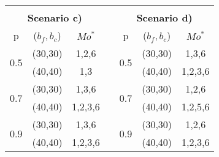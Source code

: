 \begin{table}[h]
{\begin{tabular}{ccccccc}
                                           &                                  &                              &                       &                                           &                                  &                              \\
\multicolumn{3}{c}{\textbf{Scenario c)}}                                                                     &                       & \multicolumn{3}{c}{\textbf{Scenario d)}}                                                                    \\ \cline{1-3} \cline{5-7} 
\multicolumn{1}{|c|}{p}                    & \multicolumn{1}{c|}{($b_f,b_c$)} & \multicolumn{1}{c|}{$Mo^*$}  & \multicolumn{1}{c|}{} & \multicolumn{1}{c|}{p}                    & \multicolumn{1}{c|}{($b_f,b_c$)} & \multicolumn{1}{c|}{$Mo^*$}  \\ \cline{1-3} \cline{5-7} 
\multicolumn{1}{|c|}{\multirow{2}{*}{0.5}} & \multicolumn{1}{c|}{(30,30)}     & \multicolumn{1}{c|}{1,2,6}   & \multicolumn{1}{c|}{} & \multicolumn{1}{c|}{\multirow{2}{*}{0.5}} & \multicolumn{1}{c|}{(30,30)}     & \multicolumn{1}{c|}{1,3,6}   \\ \cline{2-3} \cline{6-7} 
\multicolumn{1}{|c|}{}                     & \multicolumn{1}{c|}{(40,40)}     & \multicolumn{1}{c|}{1,3}     & \multicolumn{1}{c|}{} & \multicolumn{1}{c|}{}                     & \multicolumn{1}{c|}{(40,40)}     & \multicolumn{1}{c|}{1,2,3,6} \\ \cline{1-3} \cline{5-7} 
\multicolumn{1}{|c|}{\multirow{2}{*}{0.7}} & \multicolumn{1}{c|}{(30,30)}     & \multicolumn{1}{c|}{1,3,6}   & \multicolumn{1}{c|}{} & \multicolumn{1}{c|}{\multirow{2}{*}{0.7}} & \multicolumn{1}{c|}{(30,30)}     & \multicolumn{1}{c|}{1,2,6}   \\ \cline{2-3} \cline{6-7} 
\multicolumn{1}{|c|}{}                     & \multicolumn{1}{c|}{(40,40)}     & \multicolumn{1}{c|}{1,2,3,6} & \multicolumn{1}{c|}{} & \multicolumn{1}{c|}{}                     & \multicolumn{1}{c|}{(40,40)}     & \multicolumn{1}{c|}{1,2,5,6} \\ \cline{1-3} \cline{5-7} 
\multicolumn{1}{|c|}{\multirow{2}{*}{0.9}} & \multicolumn{1}{c|}{(30,30)}     & \multicolumn{1}{c|}{1,3,6}   & \multicolumn{1}{c|}{} & \multicolumn{1}{c|}{\multirow{2}{*}{0.9}} & \multicolumn{1}{c|}{(30,30)}     & \multicolumn{1}{c|}{1,2,6}   \\ \cline{2-3} \cline{6-7} 
\multicolumn{1}{|c|}{}                     & \multicolumn{1}{c|}{(40,40)}     & \multicolumn{1}{c|}{1,2,3,6} & \multicolumn{1}{c|}{} & \multicolumn{1}{c|}{}                     & \multicolumn{1}{c|}{(40,40)}     & \multicolumn{1}{c|}{1,2,3,6} \\ \cline{1-3} \cline{5-7} 

\end{tabular}}
\end{table}
